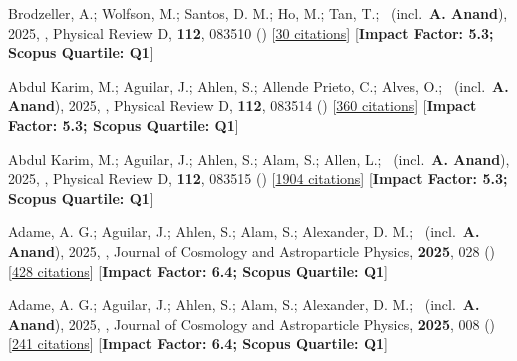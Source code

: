 \item[{\color{numcolor}\scriptsize14}] Brodzeller, A.; Wolfson, M.; Santos, D. M.; Ho, M.; Tan, T.; \etal\ (incl.\ \textbf{A. Anand}), 2025, , Physical Review D, \textbf{112}, 083510 () [\href{https://ui.adsabs.harvard.edu/abs/2025PhRvD.112h3510B}{30 citations}] [\textbf{Impact Factor: 5.3; Scopus Quartile: Q1}]

\item[{\color{numcolor}\scriptsize13}] Abdul Karim, M.; Aguilar, J.; Ahlen, S.; Allende Prieto, C.; Alves, O.; \etal\ (incl.\ \textbf{A. Anand}), 2025, , Physical Review D, \textbf{112}, 083514 () [\href{https://ui.adsabs.harvard.edu/abs/2025PhRvD.112h3514A}{360 citations}] [\textbf{Impact Factor: 5.3; Scopus Quartile: Q1}]

\item[{\color{numcolor}\scriptsize12}] Abdul Karim, M.; Aguilar, J.; Ahlen, S.; Alam, S.; Allen, L.; \etal\ (incl.\ \textbf{A. Anand}), 2025, , Physical Review D, \textbf{112}, 083515 () [\href{https://ui.adsabs.harvard.edu/abs/2025PhRvD.112h3515A}{1904 citations}] [\textbf{Impact Factor: 5.3; Scopus Quartile: Q1}]

\item[{\color{numcolor}\scriptsize11}] Adame, A. G.; Aguilar, J.; Ahlen, S.; Alam, S.; Alexander, D. M.; \etal\ (incl.\ \textbf{A. Anand}), 2025, , Journal of Cosmology and Astroparticle Physics, \textbf{2025}, 028 () [\href{https://ui.adsabs.harvard.edu/abs/2025JCAP...07..028A}{428 citations}] [\textbf{Impact Factor: 6.4; Scopus Quartile: Q1}]

\item[{\color{numcolor}\scriptsize10}] Adame, A. G.; Aguilar, J.; Ahlen, S.; Alam, S.; Alexander, D. M.; \etal\ (incl.\ \textbf{A. Anand}), 2025, , Journal of Cosmology and Astroparticle Physics, \textbf{2025}, 008 () [\href{https://ui.adsabs.harvard.edu/abs/2025JCAP...09..008A}{241 citations}] [\textbf{Impact Factor: 6.4; Scopus Quartile: Q1}]

